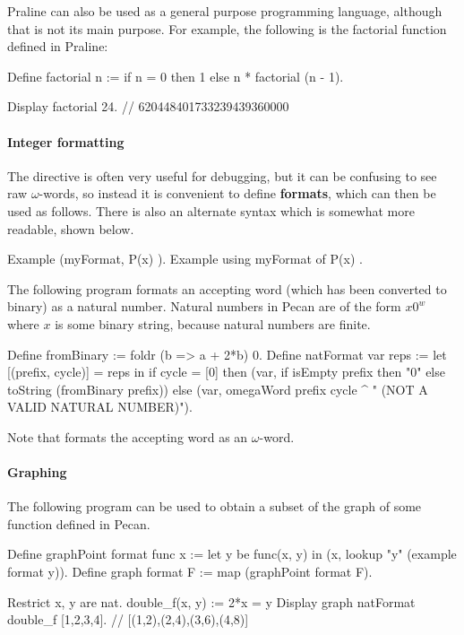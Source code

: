 Praline can also be used as a general purpose programming language, although that is not its main purpose.
For example, the following is the factorial function defined in Praline:

\begin{pecan}
Define factorial n :=
    if n = 0 then 1
    else n * factorial (n - 1).

Display factorial 24. // 620448401733239439360000
\end{pecan}

\paragraph{Integer formatting}

The  directive is often very useful for debugging, but it can be confusing to see raw $\omega$-words, so instead it is convenient to define \textbf{formats}, which can then be used as follows.
There is also an alternate syntax which is somewhat more readable, shown below.

\begin{pecan}
Example (myFormat, { P(x) }).
Example using myFormat of { P(x) }.
\end{pecan}

The following program formats an accepting word (which has been converted to binary) as a natural number.
Natural numbers in Pecan are of the form $x0^w$ where $x$ is some binary string, because natural numbers are finite.

\begin{pecan}
Define fromBinary := foldr (\a b => a + 2*b) 0.
Define natFormat var reps :=
    let [(prefix, cycle)] = reps in
        if cycle = [0] then
            (var, if isEmpty prefix then "0" else toString (fromBinary prefix))
        else
            (var, omegaWord prefix cycle ^ " (NOT A VALID NATURAL NUMBER)").
\end{pecan}

Note that  formats the accepting word as an $\omega$-word.

\paragraph{Graphing}

The following program can be used to obtain a subset of the graph of some function defined in Pecan.

\begin{pecan}
Define graphPoint format func x :=
    let y be { func(x, y) } in
    (x, lookup "y" (example format y)).
Define graph format F := map (graphPoint format F).

Restrict x, y are nat.
double_f(x, y) := 2*x = y
Display graph natFormat double_f [1,2,3,4]. // [(1,2),(2,4),(3,6),(4,8)]
\end{pecan}

